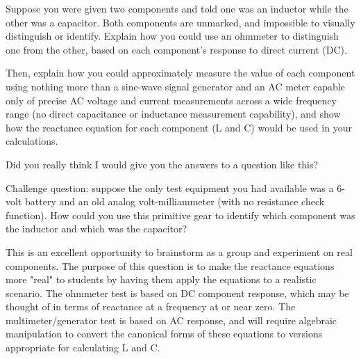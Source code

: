 

Suppose you were given two components and told one was an inductor while the other was a capacitor.  Both components are unmarked, and impossible to visually distinguish or identify.  Explain how you could use an ohmmeter to distinguish one from the other, based on each component's response to direct current (DC).

Then, explain how you could approximately measure the value of each component using nothing more than a sine-wave signal generator and an AC meter capable only of precise AC voltage and current measurements across a wide frequency range (no direct capacitance or inductance measurement capability), and show how the reactance equation for each component (L and C) would be used in your calculations.







Did you really think I would give you the answers to a question like this?

\vskip 10pt

Challenge question: suppose the only test equipment you had available was a 6-volt battery and an old analog volt-milliammeter (with no resistance check function).  How could you use this primitive gear to identify which component was the inductor and which was the capacitor?







This is an excellent opportunity to brainstorm as a group and experiment on real components.  The purpose of this question is to make the reactance equations more "real" to students by having them apply the equations to a realistic scenario.  The ohmmeter test is based on DC component response, which may be thought of in terms of reactance at a frequency at or near zero.  The multimeter/generator test is based on AC response, and will require algebraic manipulation to convert the canonical forms of these equations to versions appropriate for calculating L and C.





